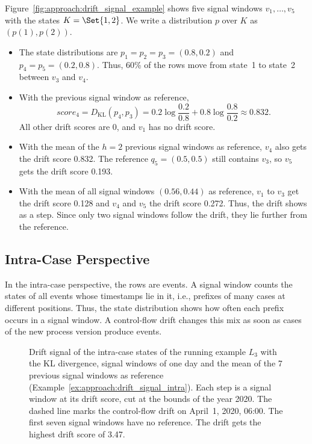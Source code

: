 \begin{example}
	\label{ex:approach:drift_signal}
	Figure~\ref{fig:approach:drift_signal_example} shows five signal windows $v_1, \dots, v_5$ with the states $K = \Set{1, 2}$. We write a distribution $p$ over $K$ as $(p(1), p(2))$.
	\begin{itemize}
		\item The state distributions are $p_1 = p_2 = p_3 = (0.8, 0.2)$ and $p_4 = p_5 = (0.2, 0.8)$. Thus, 60\% of the rows move from state~1 to state~2 between $v_3$ and $v_4$.

		\item With the previous signal window as reference,
		      \[
			      \mathit{score}_4 = D_{\mathrm{KL}}(p_4, p_3) = 0.2 \log \frac{0.2}{0.8} + 0.8 \log \frac{0.8}{0.2} \approx 0.832.
		      \]
		      All other drift scores are 0, and $v_1$ has no drift score.

		\item With the mean of the $h = 2$ previous signal windows as reference, $v_4$ also gets the drift score 0.832. The reference $q_5 = (0.5, 0.5)$ still contains $v_3$, so $v_5$ gets the drift score 0.193.

		\item With the mean of all signal windows $(0.56, 0.44)$ as reference, $v_1$ to $v_3$ get the drift score 0.128 and $v_4$ and $v_5$ the drift score 0.272. Thus, the drift shows as a step. Since only two signal windows follow the drift, they lie further from the reference.
	\end{itemize}
\end{example}

\subsection{Intra-Case Perspective}
\label{sec:approach:drift_signals:intra}
In the intra-case perspective, the rows are events. A signal window counts the states of all events whose timestamps lie in it, i.e., prefixes of many cases at different positions. Thus, the state distribution shows how often each prefix occurs in a signal window. A control-flow drift changes this mix as soon as cases of the new process version produce events.

\begin{figure}[tb]
	\centering
	
	\caption[Intra-case drift signal of the running example]{%
		Drift signal of the intra-case states of the running example $L_3$ with the KL divergence, signal windows of one day and the mean of the 7 previous signal windows as reference (Example~\ref{ex:approach:drift_signal_intra}). Each step is a signal window at its drift score, cut at the bounds of the year 2020. The dashed line marks the control-flow drift on April~1, 2020, 06:00. The first seven signal windows have no reference. The drift gets the highest drift score of 3.47.}
	\label{fig:approach:drift_signal_intra}
\end{figure}

